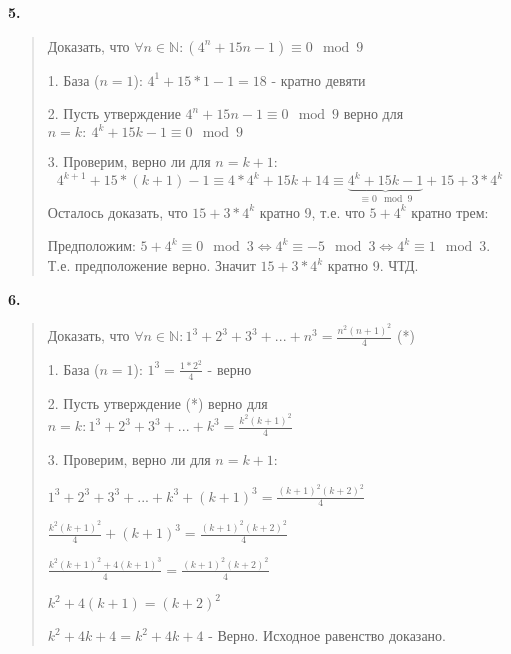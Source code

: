 \documentclass{article}
\begin{document}
\textsf{\textbf{5.}}
\begin{quote}
\leftskip=0.2cm    

Доказать, что $\forall n \in \mathbb{N}: (4^n + 15n - 1) \equiv 0 \mod 9$

1. База ($n = 1$): $4^1 + 15 * 1 - 1 = 18$ - кратно девяти

2. Пусть утверждение $4^n + 15n - 1 \equiv 0 \mod 9$ верно для $n=k : \ 4^k + 15k - 1 \equiv 0 \mod 9$

3. Проверим, верно ли для $n = k + 1  : \ $
\[
    4^{k + 1} + 15*(k + 1) - 1 \equiv 4 * 4^k + 15k + 14
    \equiv \underbrace{4^k + 15k - 1}_{\equiv 0 \mod 9} + 15 + 3 * 4^k
\]
Осталось доказать, что $15 + 3 * 4^k$ кратно 9, т.е. что $5 + 4^k$ кратно трем:

Предположим: $5 + 4^k \equiv 0 \mod 3 \Leftrightarrow 4^k \equiv -5 \mod 3 \Leftrightarrow 4^k 
\equiv 1 \mod 3 .$  Т.е. предположение верно. Значит $15 + 3 * 4^k$ кратно 9. ЧТД.


\end{quote}
\textsf{\textbf{6.}}
\begin{quote}
\leftskip=0.2cm    

Доказать, что $\forall n \in \mathbb{N}: 1^3 + 2^3 + 3^3 + ... + n^3 = \frac{n^2(n+1)^2}{4}$ (*)

1. База ($n = 1$): $1^3 = \frac{1 * 2^2}{4}$ - верно

2. Пусть утверждение (*) верно для $n=k : 1^3 + 2^3 + 3^3 + ... + k^3 = \frac{k^2(k+1)^2}{4}$

3. Проверим, верно ли для $n = k + 1  : \ $
\begin{center}
    
$1^3 + 2^3 + 3^3 + ... + k^3 + (k + 1)^3 = \frac{(k + 1)^2(k+2)^2}{4}$

$\frac{k^2(k+1)^2}{4}+ (k + 1)^3 = \frac{(k + 1)^2(k+2)^2}{4}$

$\frac{k^2(k+1)^2 + 4(k + 1)^3}{4} = \frac{(k + 1)^2(k+2)^2}{4}$

$k^2 + 4(k + 1) = (k+2)^2$

$k^2 + 4k + 4 = k^2 + 4k + 4$ - Верно. Исходное равенство доказано.
\end{center}
\end{quote}
\end{document}
